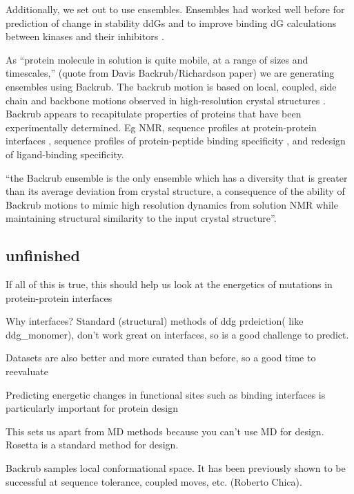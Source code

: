 Additionally, we set out to use ensembles. Ensembles had worked well before for prediction of change in stability ddGs \cite{benedix_predicting_2009} and to improve binding dG calculations between kinases and their inhibitors \cite{araki_effect_2016}.

As ``protein molecule in solution is quite mobile, at a range of sizes and timescales,'' (quote from Davis Backrub/Richardson paper) we are generating ensembles using Backrub. The backrub motion is based on local, coupled, side chain and backbone motions observed in high-resolution crystal structures \cite{davis_backrub_2006}. Backrub appears to recapitulate properties of proteins that have been experimentally determined. Eg NMR\cite{friedland_correspondence_2009}, sequence profiles at protein-protein interfaces \cite{humphris_prediction_2008}, sequence profiles of protein-peptide binding specificity \cite{smith_structure-based_2010,smith_predicting_2011}, and redesign of ligand-binding specificity\cite{ollikainen_coupling_2015}.

``the Backrub ensemble is the only ensemble which has a diversity that is greater than its average deviation from crystal structure, a consequence of the ability of Backrub motions to mimic high resolution dynamics from solution NMR while maintaining structural similarity to the input crystal structure''.\cite{davey_improving_2014}

\subsection{unfinished}
If all of this is true, this should help us look at the energetics of mutations in protein-protein interfaces

Why interfaces? Standard (structural) methods of ddg prdeiction( like ddg\_monomer), don't work great on interfaces, so is a good challenge to predict.

Datasets are also better and more curated than before, so a good time to reevaluate

Predicting energetic changes in functional sites such as binding interfaces is particularly important for protein design

This sets us apart from MD methods because you can't use MD for design. Rosetta is a standard method for design.

Backrub samples local conformational space.
It has been previously shown to be successful at sequence tolerance, coupled moves, etc. (Roberto Chica).


